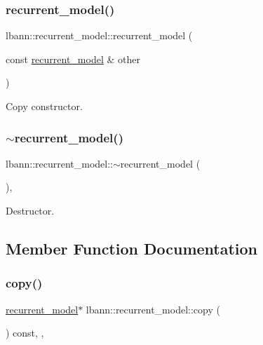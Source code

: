 \subsubsection{\texorpdfstring{recurrent\+\_\+model()}{recurrent\_model()}\hspace{0.1cm}{\footnotesize\ttfamily [2/2]}}
{\footnotesize\ttfamily lbann\+::recurrent\+\_\+model\+::recurrent\+\_\+model (\begin{DoxyParamCaption}\item[{const \hyperlink{classlbann_1_1recurrent__model}{recurrent\+\_\+model} \&}]{other }\end{DoxyParamCaption})\hspace{0.3cm}{\ttfamily [default]}}

Copy constructor. \mbox{\label{classlbann_1_1recurrent__model_aa52648414c397fc4a11ac462c278a4f1}} 
\subsubsection{\texorpdfstring{$\sim$recurrent\+\_\+model()}{~recurrent\_model()}}
{\footnotesize\ttfamily lbann\+::recurrent\+\_\+model\+::$\sim$recurrent\+\_\+model (\begin{DoxyParamCaption}{ }\end{DoxyParamCaption})\hspace{0.3cm}{\ttfamily [override]}, {\ttfamily [default]}}

Destructor. 

\subsection{Member Function Documentation}
\mbox{\label{classlbann_1_1recurrent__model_ad184f898241fe026f140db689f129d47}} 
\subsubsection{\texorpdfstring{copy()}{copy()}}
{\footnotesize\ttfamily \hyperlink{classlbann_1_1recurrent__model}{recurrent\+\_\+model}$\ast$ lbann\+::recurrent\+\_\+model\+::copy (\begin{DoxyParamCaption}{ }\end{DoxyParamCaption}) const\hspace{0.3cm}{\ttfamily [inline]}, {\ttfamily [override]}, {\ttfamily [virtual]}}

